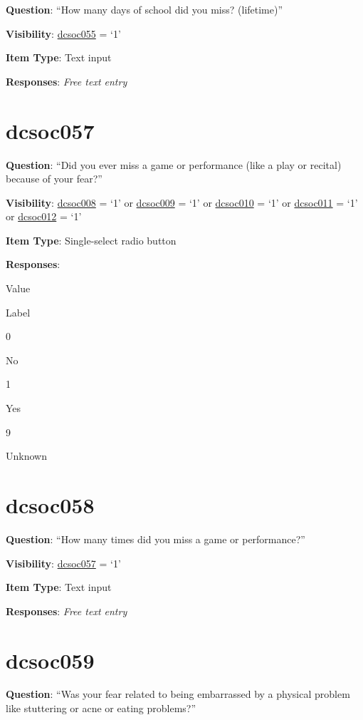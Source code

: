 \documentclass[]{book}
\begin{document}
\textbf{Question}: ``How many days of school did you miss? (lifetime)''

\textbf{Visibility}: \protect\hyperlink{dcsoc055}{dcsoc055} = `1'

\textbf{Item Type}: Text input

\textbf{Responses}: \emph{Free text entry}

\hypertarget{dcsoc057}{%
\section{dcsoc057}\label{dcsoc057}}

\textbf{Question}: ``Did you ever miss a game or performance (like a play or recital) because of your fear?''

\textbf{Visibility}: \protect\hyperlink{dcsoc008}{dcsoc008} = `1' or \protect\hyperlink{dcsoc009}{dcsoc009} = `1' or \protect\hyperlink{dcsoc010}{dcsoc010} = `1' or \protect\hyperlink{dcsoc011}{dcsoc011} = `1' or \protect\hyperlink{dcsoc012}{dcsoc012} = `1'

\textbf{Item Type}: Single-select radio button

\textbf{Responses}:

Value

Label

0

No

1

Yes

9

Unknown

\hypertarget{dcsoc058}{%
\section{dcsoc058}\label{dcsoc058}}

\textbf{Question}: ``How many times did you miss a game or performance?''

\textbf{Visibility}: \protect\hyperlink{dcsoc057}{dcsoc057} = `1'

\textbf{Item Type}: Text input

\textbf{Responses}: \emph{Free text entry}

\hypertarget{dcsoc059}{%
\section{dcsoc059}\label{dcsoc059}}

\textbf{Question}: ``Was your fear related to being embarrassed by a physical problem like stuttering or acne or eating problems?''
\end{document}
